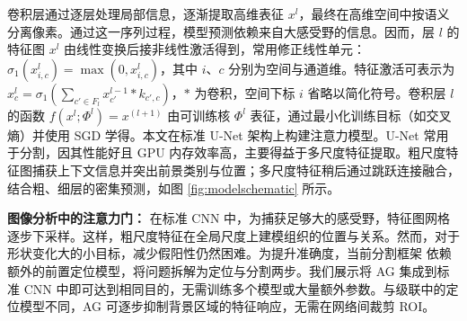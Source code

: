 \documentclass{article}
\begin{document}
卷积层通过逐层处理局部信息，逐渐提取高维表征 $x^l$，最终在高维空间中按语义分离像素。通过这一序列过程，模型预测依赖来自大感受野的信息。因而，层 $l$ 的特征图 $x^l$ 由线性变换后接非线性激活得到，常用修正线性单元：$\sigma_1(x_{i,c}^l) = \max(0, x_{i,c}^l)$，其中 $i$、$c$ 分别为空间与通道维。特征激活可表示为 $x_c^l= \sigma_1 \left(  \sum_{c' \in F_l}  x_{c'}^{l-1} * k_{c' , c} \right)$，$*$ 为卷积，空间下标 $i$ 省略以简化符号。卷积层 $l$ 的函数 $f (x^{l} ; \Phi^{l}) = x^{(l+1)}$ 由可训练核 $\Phi^{l}$ 表征，通过最小化训练目标（如交叉熵）并使用 SGD 学得。本文在标准 U-Net 架构上构建注意力模型。U-Net 常用于分割，因其性能好且 GPU 内存效率高，主要得益于多尺度特征提取。粗尺度特征图捕获上下文信息并突出前景类别与位置；多尺度特征稍后通过跳跃连接融合，结合粗、细层的密集预测，如图 \ref{fig:modelschematic} 所示。 

\textbf{图像分析中的注意力门：} 在标准 CNN 中，为捕获足够大的感受野，特征图网格逐步下采样。这样，粗尺度特征在全局尺度上建模组织的位置与关系。然而，对于形状变化大的小目标，减少假阳性仍然困难。为提升准确度，当前分割框架 \cite{khened2018fully, roth2018media, roth2017hierarchical} 依赖额外的前置定位模型，将问题拆解为定位与分割两步。我们展示将 AG 集成到标准 CNN 中即可达到相同目的，无需训练多个模型或大量额外参数。与级联中的定位模型不同，AG 可逐步抑制背景区域的特征响应，无需在网络间裁剪 ROI。
\end{document}
